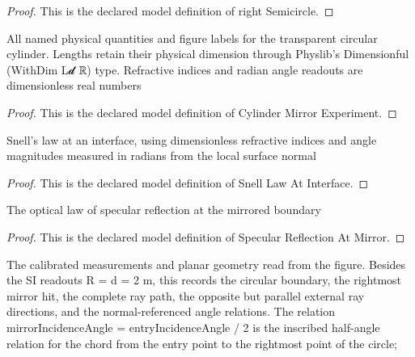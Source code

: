 \begin{proof}
  This is the declared model definition of right Semicircle.
\end{proof}
\begin{definition}
  \label{def:physics:phyx-mini-0020:phyxminiproblems-problemphyxmini0020-cylindermirrorexperiment}
  All named physical quantities and figure labels for the transparent circular cylinder. Lengths retain their physical dimension through Physlib's Dimensionful (WithDim L𝓭 ℝ) type. Refractive indices and radian angle readouts are dimensionless real numbers
\end{definition}
\begin{proof}
  This is the declared model definition of Cylinder Mirror Experiment.
\end{proof}
\begin{definition}
  \label{def:physics:phyx-mini-0020:phyxminiproblems-problemphyxmini0020-snelllawatinterface}
  Snell's law at an interface, using dimensionless refractive indices and angle magnitudes measured in radians from the local surface normal
\end{definition}
\begin{proof}
  This is the declared model definition of Snell Law At Interface.
\end{proof}
\begin{definition}
  \label{def:physics:phyx-mini-0020:phyxminiproblems-problemphyxmini0020-specularreflectionatmirror}
  The optical law of specular reflection at the mirrored boundary
\end{definition}
\begin{proof}
  This is the declared model definition of Specular Reflection At Mirror.
\end{proof}
\begin{definition}
  \label{def:physics:phyx-mini-0020:phyxminiproblems-problemphyxmini0020-cylinderfigurereadout}
  The calibrated measurements and planar geometry read from the figure. Besides the SI readouts R = d = 2 m, this records the circular boundary, the rightmost mirror hit, the complete ray path, the opposite but parallel external ray directions, and the normal-referenced angle relations. The relation mirrorIncidenceAngle = entryIncidenceAngle / 2 is the inscribed half-angle relation for the chord from the entry point to the rightmost point of the circle;
\end{definition}
